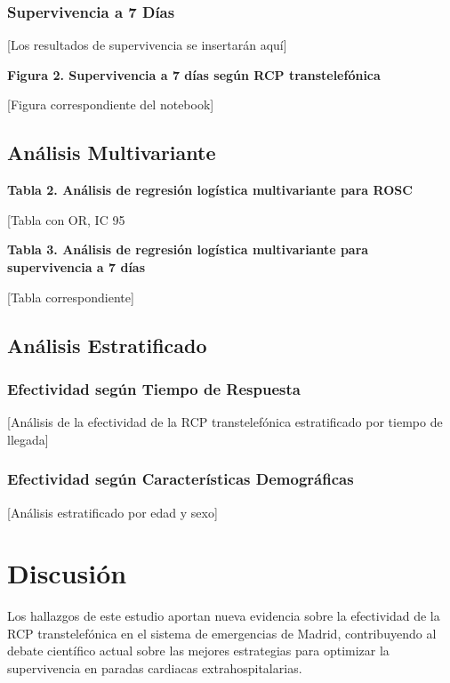 \documentclass[10pt,a4paper]{article}
\begin{document}
\begin{multicols}{2}
\subsubsection{Supervivencia a 7 Días}

[Los resultados de supervivencia se insertarán aquí]

\textbf{Figura 2. Supervivencia a 7 días según RCP transtelefónica}

[Figura correspondiente del notebook]

\subsection{Análisis Multivariante}

\textbf{Tabla 2. Análisis de regresión logística multivariante para ROSC}

[Tabla con OR, IC 95%

\textbf{Tabla 3. Análisis de regresión logística multivariante para supervivencia a 7 días}

[Tabla correspondiente]

\subsection{Análisis Estratificado}

\subsubsection{Efectividad según Tiempo de Respuesta}

[Análisis de la efectividad de la RCP transtelefónica estratificado por tiempo de llegada]

\subsubsection{Efectividad según Características Demográficas}

[Análisis estratificado por edad y sexo]

\section{Discusión}

Los hallazgos de este estudio aportan nueva evidencia sobre la efectividad de la RCP transtelefónica en el sistema de emergencias de Madrid, contribuyendo al debate científico actual sobre las mejores estrategias para optimizar la supervivencia en paradas cardiacas extrahospitalarias.


\end{multicols}
\end{document}

